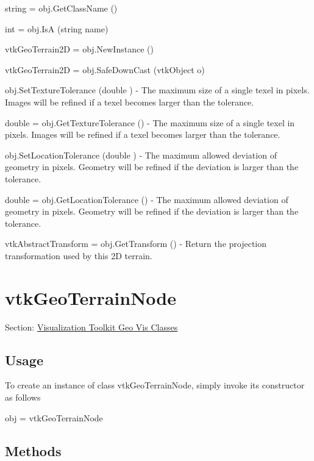 \begin{DoxyItemize}
\item {\ttfamily string = obj.\-Get\-Class\-Name ()}  
\item {\ttfamily int = obj.\-Is\-A (string name)}  
\item {\ttfamily vtk\-Geo\-Terrain2\-D = obj.\-New\-Instance ()}  
\item {\ttfamily vtk\-Geo\-Terrain2\-D = obj.\-Safe\-Down\-Cast (vtk\-Object o)}  
\item {\ttfamily obj.\-Set\-Texture\-Tolerance (double )} -\/ The maximum size of a single texel in pixels. Images will be refined if a texel becomes larger than the tolerance.  
\item {\ttfamily double = obj.\-Get\-Texture\-Tolerance ()} -\/ The maximum size of a single texel in pixels. Images will be refined if a texel becomes larger than the tolerance.  
\item {\ttfamily obj.\-Set\-Location\-Tolerance (double )} -\/ The maximum allowed deviation of geometry in pixels. Geometry will be refined if the deviation is larger than the tolerance.  
\item {\ttfamily double = obj.\-Get\-Location\-Tolerance ()} -\/ The maximum allowed deviation of geometry in pixels. Geometry will be refined if the deviation is larger than the tolerance.  
\item {\ttfamily vtk\-Abstract\-Transform = obj.\-Get\-Transform ()} -\/ Return the projection transformation used by this 2\-D terrain.  
\end{DoxyItemize}\hypertarget{vtkgeovis_vtkgeoterrainnode}{}\section{vtk\-Geo\-Terrain\-Node}\label{vtkgeovis_vtkgeoterrainnode}
Section\-: \hyperlink{sec_vtkgeovis}{Visualization Toolkit Geo Vis Classes} \hypertarget{vtkwidgets_vtkxyplotwidget_Usage}{}\subsection{Usage}\label{vtkwidgets_vtkxyplotwidget_Usage}
To create an instance of class vtk\-Geo\-Terrain\-Node, simply invoke its constructor as follows \begin{DoxyVerb}  obj = vtkGeoTerrainNode
\end{DoxyVerb}
 \hypertarget{vtkwidgets_vtkxyplotwidget_Methods}{}\subsection{Methods}\label{vtkwidgets_vtkxyplotwidget_Methods}

